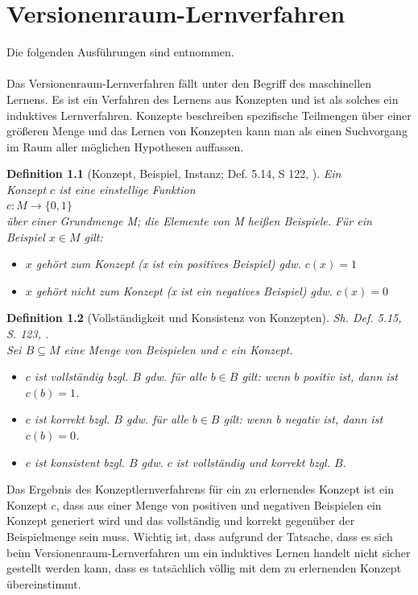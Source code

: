 \documentclass[draft]{scrreprt}
\newtheorem{Def}{Definition }[section]
\begin{document}
{	\chapter{Versionenraum-Lernverfahren} \label{VRL} 
	Die folgenden Ausführungen sind \cite{BKI08} entnommen.\\
	\\
	 Das Versionenraum-Lernverfahren fällt unter den Begriff des maschinellen Lernens. Es ist ein Verfahren des Lernens aus Konzepten und ist als solches ein induktives Lernverfahren. Konzepte beschreiben spezifische Teilmengen über einer größeren Menge und das Lernen von Konzepten kann man als einen Suchvorgang im Raum aller möglichen Hypothesen auffassen. 
	\begin{Def}[Konzept, Beispiel, Instanz; Def. 5.14, S 122, \cite{BKI08}]
		Ein \\  Konzept $ c $ ist eine einstellige Funktion\\
		\hspace{2cm} $ c: M \rightarrow \{0,1\} $\\	
		über einer Grundmenge M; die Elemente von M heißen Beispiele. Für ein Beispiel $ x \in M $ gilt:\\
		\begin{itemize}
			\item $ x $ gehört zum Konzept (x ist ein positives Beispiel) gdw. $ c(x) = 1 $
			\item $ x $ gehört nicht zum Konzept (x ist ein negatives Beispiel) gdw. $ c(x) = 0 $
		\end{itemize}
	\end{Def}
\begin{Def}[Vollständigkeit und Konsistenz von Konzepten] 
	Sh.  Def. 5.15, S. 123, \cite{BKI08}.\\
	Sei $ B \subseteq M $ eine Menge von Beispielen und $ c $ ein Konzept.
	\begin{itemize}
		\item $ c $ ist vollständig bzgl. $ B $ gdw. für alle $ b \in B $ gilt: wenn $ b $ positiv ist, dann ist $ c(b) = 1 $.
		\item $ c $ ist korrekt bzgl. $ B $ gdw. für alle $ b \in B $ gilt: wenn b negativ ist, dann ist $ c(b) = 0 $.
		\item $ c $ ist konsistent bzgl. $ B $ gdw. $ c $ ist vollständig und korrekt bzgl. $ B $. 
	\end{itemize}
\end{Def}
Das Ergebnis des Konzeptlernverfahrens für ein zu erlernendes Konzept ist ein Konzept $ c $, dass aus einer Menge von positiven und negativen Beispielen ein Konzept generiert wird und das vollständig und korrekt gegenüber der Beispielmenge sein muss. Wichtig ist, dass aufgrund der Tatsache, dass es sich beim Versionenraum-Lernverfahren um ein induktives Lernen handelt nicht sicher gestellt werden kann, dass es tatsächlich völlig mit dem zu erlernenden Konzept übereinstimmt.
}
\end{document}

